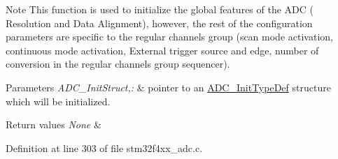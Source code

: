 \begin{DoxyNote}{Note}
This function is used to initialize the global features of the A\-D\-C ( Resolution and Data Alignment), however, the rest of the configuration parameters are specific to the regular channels group (scan mode activation, continuous mode activation, External trigger source and edge, number of conversion in the regular channels group sequencer). 
\end{DoxyNote}

\begin{DoxyParams}{Parameters}
{\em A\-D\-C\-\_\-\-Init\-Struct,\-:} & pointer to an \hyperlink{struct_a_d_c___init_type_def}{A\-D\-C\-\_\-\-Init\-Type\-Def} structure which will be initialized. \\
\hline
\end{DoxyParams}

\begin{DoxyRetVals}{Return values}
{\em None} & \\
\hline
\end{DoxyRetVals}


Definition at line 303 of file stm32f4xx\-\_\-adc.\-c.

